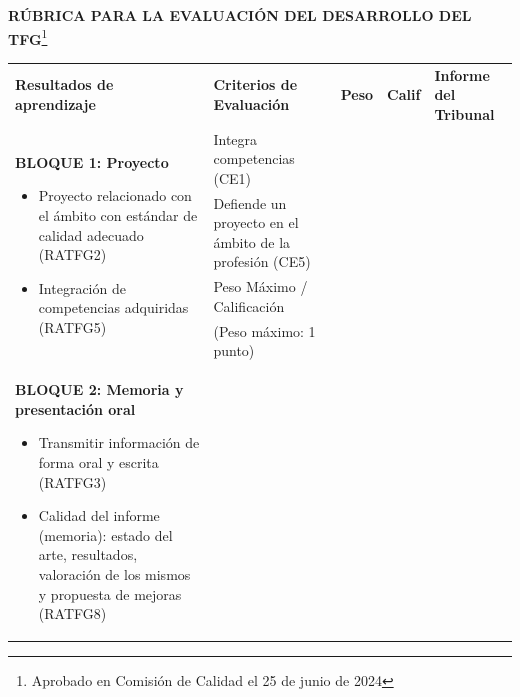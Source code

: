 %
%

\begin{landscape}
\thispagestyle{plain}
\noindent \textbf{RÚBRICA PARA LA EVALUACIÓN DEL DESARROLLO DEL TFG}\footnote{Aprobado en Comisión de Calidad el 25 de junio de 2024}
\renewcommand{\arraystretch}{1.4} %

\begin{table}[ht]
  \centering
  \small
\begin{tabularx}{\linewidth}{|p{7cm}|p{9cm}|p{1cm}|p{1cm}|p{5cm}|}
\cline{1-5}
\textbf{Resultados de aprendizaje} & \textbf{Criterios de Evaluación} & \textbf{Peso} & \textbf{Calif} & \textbf{Informe del Tribunal} \\ \cline{1-5}
  \multirow{4}{=}{%
  \begin{minipage}[t]{7cm}
    \textbf{BLOQUE 1: Proyecto}
    \begin{itemize}[left=5pt, itemsep=1pt, topsep=1pt]
      \item Proyecto relacionado con el ámbito con estándar de calidad adecuado (RATFG2)
      \item Integración de competencias adquiridas (RATFG5)
    \end{itemize}
  \end{minipage}}
    & Integra competencias (CE1) &  &  & \multirow[t]{7}{=}{} \\ \cline{2-4}
    & Defiende un proyecto en el ámbito de la profesión (CE5) &  &  &  \\ \cline{2-4}
    & \cellcolor[HTML]{C0C0C0}Peso Máximo / Calificación &  &  &  \\
    & \cellcolor[HTML]{C0C0C0}(Peso máximo: 1 punto) &  &  &  \\ \cline{1-5}
  \multirow{8}{=}{%
  \begin{minipage}[t]{7cm}
    \vspace{-5mm}
    \textbf{BLOQUE 2: Memoria y presentación oral}
    \begin{itemize}[left=5pt, itemsep=1pt, topsep=1pt]
      \item Transmitir información de forma oral y escrita (RATFG3)
      \item Calidad del informe (memoria): estado del arte, resultados, valoración de los mismos y propuesta de mejoras (RATFG8)

\end{itemize}
\end{minipage}}
\end{tabularx}
\end{table}
\end{landscape}
